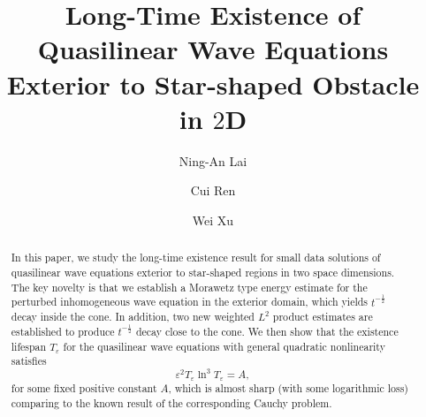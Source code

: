 \documentclass[11pt, reqno]{amsart}
\theoremstyle{definition}
\theoremstyle{remark}
\theoremstyle{definition}
\numberwithin{equation}{section}
\newcommand{\e}{\varepsilon}
\numberwithin{equation}{section}
\begin{document}
\title[Long-Time Existence for 2-Dimensional Quasilinear Wave Equations]{Long-Time Existence of Quasilinear Wave Equations Exterior to Star-shaped Obstacle in 
$2\mathbf{D}$}


\author{Ning-An Lai}
\address{School of Mathematical Sciences, Zhejiang Normal University, Jinhua 321004, China}


\author{Cui Ren}
\address{School of Mathematical Sciences, Zhejiang Normal University, Jinhua 321004, China}

\author{Wei Xu}
\address{Corresponding author at: School of Mathematics and Information Sciences, Nanchang Hangkong University,
Nanchang, China}







\begin{abstract}

In this paper, we study the long-time existence result for small
data solutions of quasilinear  wave equations exterior to star-shaped
regions in two space dimensions. The key novelty is that we establish a
Morawetz type energy estimate for the perturbed inhomogeneous wave equation in the exterior domain, which yields $t^{-\frac12}$ decay inside the cone. In 
addition, two new weighted $L^2$ product estimates are established to produce $t^{-\frac12}$ decay close to the cone.
We then show that the existence lifespan $T_\e$ for the quasilinear wave equations with general quadratic nonlinearity satisfies
\begin{equation*}
\varepsilon^2T_{\varepsilon}\ln^3T_{\varepsilon}=A,
\end{equation*}
for some fixed positive constant $A$, which is almost sharp (with some logarithmic loss) comparing to the known result of the corresponding Cauchy problem.

\end{abstract}
\end{document}
